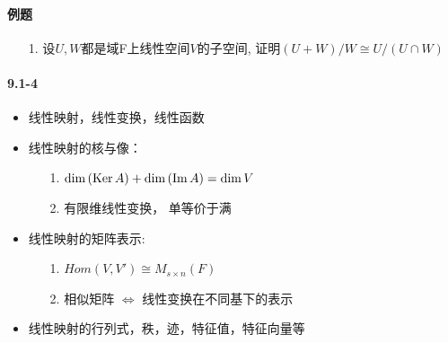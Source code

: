 \paragraph{例题}
\begin{itemize}
    \item [1.] 设$U,W$都是域F上线性空间$V$的子空间, 证明$(U+W)/W \cong U/(U\cap W)$
    \vspace{2cm}
\end{itemize}

\paragraph{9.1-4}
\begin{itemize}
    \item 线性映射，线性变换，线性函数
    \item 线性映射的核与像：
    \begin{itemize}
        \item[1.] $\dim{(\mathrm{Ker}\,A)} + \dim{(\mathrm{Im}\,A)} = \dim{V}$
        \item[2.] 有限维线性变换， 单等价于满
    \end{itemize}
    \item 线性映射的矩阵表示:
    \begin{itemize}
        \item[1.] $Hom(V,V') \cong M_{s \times n}(F)$
        \item[2.] 相似矩阵 $\Longleftrightarrow$ 线性变换在不同基下的表示 
    \end{itemize}
    \item 线性映射的行列式，秩，迹，特征值，特征向量等
\end{itemize}

